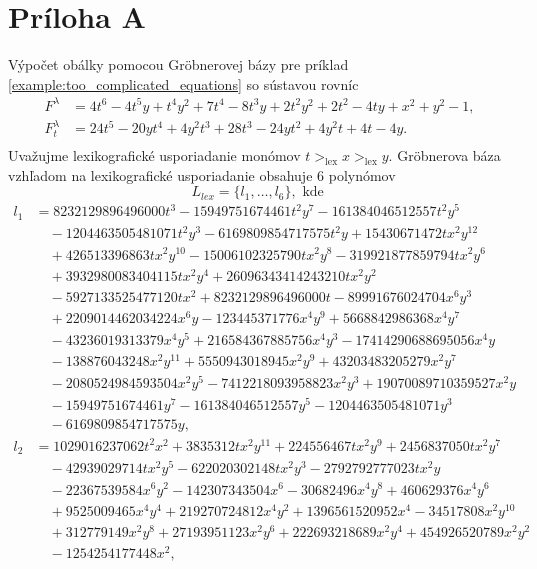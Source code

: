 \chapter{Príloha A}
\label{kap:priloha1}
Výpočet obálky pomocou Gröbnerovej bázy pre príklad \ref{example:too_complicated_equations} so sústavou rovníc
\begin{align*}
F^\lambda &= 4 t^6 - 4 t^5 y + t^4 y^2 + 7 t^4 - 8 t^3 y + 2 t^2 y^2 + 2 t^2 - 4 t y + x^2 + y^2 - 1, \\
F_t^\lambda &= 24t^5-20yt^4+4y^2t^3+28t^3-24yt^2+4y^2t+4t-4y. \\
\end{align*}
Uvažujme lexikografické usporiadanie monómov $t >_{\text{lex}}x>_{\text{lex}}y.$
Gröbnerova báza vzhľadom na lexikografické usporiadanie obsahuje $6$ polynómov
$$ L_{lex} = \{l_1,\dots, l_6 \}, \text{ kde } $$
\begin{align*}
l_1 &= 8232129896496000t^3 - 15949751674461t^2y^7 - 161384046512557t^2y^5 \\
&\quad - 1204463505481071t^2y^3 - 6169809854717575t^2y + 15430671472tx^2y^{12} \\
&\quad + 426513396863tx^2y^{10} - 15006102325790tx^2y^8 - 319921877859794tx^2y^6 \\
&\quad + 3932980083404115tx^2y^4 + 26096343414243210tx^2y^2 \\
&\quad - 5927133525477120tx^2 + 8232129896496000t - 89991676024704x^6y^3  \\
&\quad + 2209014462034224x^6y - 123445371776x^4y^9 + 5668842986368x^4y^7 \\ 
&\quad - 43236019313379x^4y^5 + 216584367885756x^4y^3 - 17414290688695056x^4y \\
&\quad - 138876043248x^2y^{11} + 5550943018945x^2y^9 + 43203483205279x^2y^7 \\
&\quad - 2080524984593504x^2y^5 - 7412218093958823x^2y^3 + 19070089710359527x^2y \\
&\quad - 15949751674461y^7 - 161384046512557y^5 - 1204463505481071y^3 \\
&\quad - 6169809854717575y, \\
l_2 &= 1029016237062t^2x^2 + 3835312tx^2y^{11} + 224556467tx^2y^9 + 2456837050tx^2y^7 \\
&\quad - 42939029714tx^2y^5 - 622020302148tx^2y^3 - 2792792777023tx^2y \\
&\quad - 22367539584x^6y^2 - 142307343504x^6 - 30682496x^4y^8 + 460629376x^4y^6 \\
&\quad + 9525009465x^4y^4 + 219270724812x^4y^2 + 1396561520952x^4 - 34517808x^2y^{10} \\
&\quad + 312779149x^2y^8 + 27193951123x^2y^6 + 222693218689x^2y^4 + 454926520789x^2y^2 \\
&\quad - 1254254177448x^2, \\
\end{align*}
